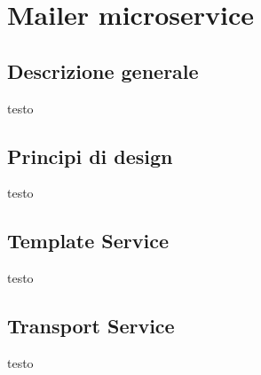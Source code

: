 
\section{Mailer microservice}
\subsection{Descrizione generale}
testo
\subsection{Principi di design}
testo
\subsection{Template Service}
testo
\subsection{Transport Service}
testo
